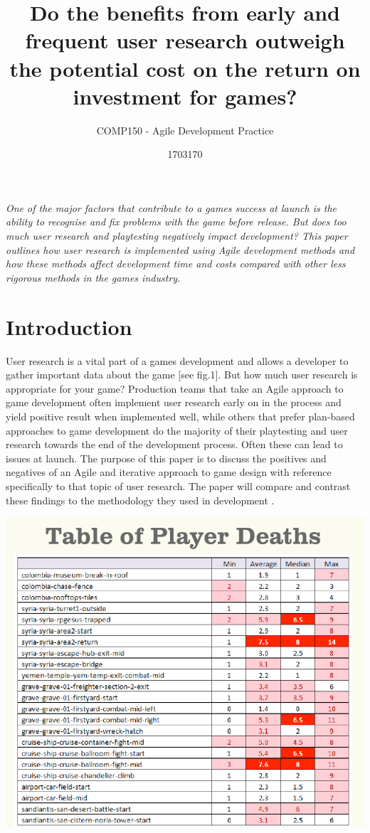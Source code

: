 \documentclass{scrartcl}
\title{Do the benefits from early and frequent user research outweigh the potential cost on the return on investment for games?
}
\subtitle{COMP150 - Agile Development Practice}
\author{1703170}
\begin{document}
\maketitle

\textit{One of the major factors that contribute to a games success at launch is the ability to recognise and fix problems with the game before release. But does too much user research and playtesting negatively impact development?  This paper outlines how user research is implemented using Agile development methods and how these methods affect development time and costs compared with other less rigorous methods in the games industry.  }

\section{Introduction}

User research is a vital part of a games development and allows a developer to gather important data about the game [see fig.1]. But how much user research is appropriate for your game? Production teams that take an Agile approach \cite{fowler2001agile:1} to game development often implement user research early on in the process and yield positive result when implemented well, while others that prefer plan-based approaches to game development do the majority of their playtesting and user research towards the end of the development process. Often these can lead to issues at launch. The purpose of this paper is to discuss the positives and negatives of an Agile and iterative approach to game design with reference specifically to that topic of user research. The paper will compare and contrast these findings to the methodology they used in development \cite{politowski2016old:2}.

\begin{center}
\includegraphics[scale=0.4]{PlayerDeathTable.png}
\end{center}
\end{document}
